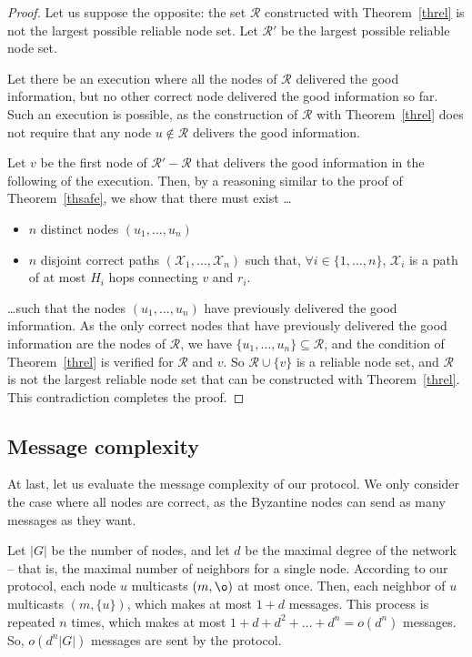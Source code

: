 \documentclass[a4paper,11pt]{article}
\begin{document}
\begin{proof}
Let us suppose the opposite: the set $\mathcal{R}$ constructed with Theorem~\ref{threl} is not the largest possible reliable node set. Let $\mathcal{R'}$ be the largest possible reliable node set.

Let there be an execution where all the nodes of $\mathcal{R}$ delivered the good information, but no other correct node delivered the good information so far.
Such an execution is possible, as the construction of $\mathcal{R}$ with Theorem~\ref{threl} does not require that any node $u \notin \mathcal{R}$ delivers the good information.

Let $v$ be the first node of $\mathcal{R'} - \mathcal{R}$ that delivers the good information in the following of the execution.
Then, by a reasoning similar to the proof of Theorem~\ref{thsafe}, we show that there must exist \dots 

\begin{itemize}
\item $n$ distinct nodes $(u_1,\dots,u_n)$
\item $n$ disjoint correct paths $(\mathcal{X}_1,\dots,\mathcal{X}_n)$ such that, $\forall i \in \{1,\dots,n\}$, $\mathcal{X}_i$ is a path of at most $H_i$ hops connecting $v$ and $r_i$.
\end{itemize}

\dots such that the nodes $(u_1,\dots,u_n)$ have previously delivered the good information.
As the only correct nodes that have previously delivered the good information are the nodes of $\mathcal{R}$, we have $\{u_1,\dots,u_n\} \subseteq \mathcal{R}$, and the condition of Theorem~\ref{threl} is verified for $\mathcal{R}$ and $v$. So $\mathcal{R} \cup \{v\}$ is a reliable node set, and $\mathcal{R}$ is not the largest reliable node set that can be constructed with Theorem~\ref{threl}. This contradiction completes the proof.
\end{proof}


\subsection{Message complexity}
\label{messcomp}

At last, let us evaluate the message complexity of our protocol. We only consider the case where all nodes are correct, as the Byzantine nodes can send as many messages as they want.

Let $|G|$ be the number of nodes, and let $d$ be the maximal degree of the network -- that is, the maximal number of neighbors for a single node.
According to our protocol, each node $u$ multicasts $(m,\o)$ at most once.
Then, each neighbor of $u$ multicasts $(m,\{u\})$, which makes at most $1 + d$ messages. This process is repeated $n$ times, which makes at most $1 + d + d^2 + \dots + d^n = o(d^n)$ messages.
So, $o(d^n|G|)$ messages are sent by the protocol.
\end{document}
